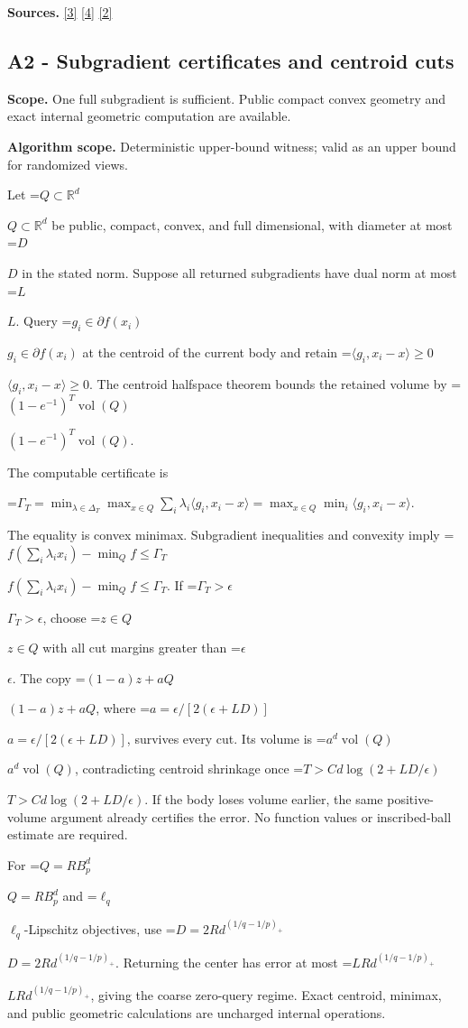\documentclass[10pt,a4paper]{article}
\newcommand{\AtlasMath}[1]{\par\begingroup\centering\setbox0=\hbox{$\displaystyle #1$}\ifdim\wd0>1.4\linewidth\typeout{ATLAS WIDE FORMULA: \the\wd0}\fi\ifdim\wd0>\linewidth\resizebox{\linewidth}{!}{\box0}\else\box0\fi\par\endgroup}
\newcommand{\AtlasInlineMath}[1]{\begingroup\setbox0=\hbox{$#1$}\ifdim\wd0>.4\linewidth\endgroup\AtlasMath{#1}\else\endgroup$#1$\fi}
\begin{document}
\textbf{Sources.} \href{https://arxiv.org/pdf/2101.09740v2}{[3]} \href{https://arxiv.org/pdf/2609.33360v2}{[4]} \href{https://arxiv.org/pdf/2609.10874}{[2]}

\subsection{A2 - Subgradient certificates and centroid cuts}
\textbf{Scope.} One full subgradient is sufficient. Public compact convex geometry and exact internal geometric computation are available.

\textbf{Algorithm scope.} Deterministic upper-bound witness; valid as an upper bound for randomized views.

Let \AtlasInlineMath{Q\subset\mathbb R^d} be public, compact, convex, and full dimensional, with diameter at most \AtlasInlineMath{D} in the stated norm. Suppose all returned subgradients have dual norm at most \AtlasInlineMath{L}. Query \AtlasInlineMath{g_i\in\partial f(x_i)} at the centroid of the current body and retain \AtlasInlineMath{\langle g_i,x_i-x\rangle\ge0}. The centroid halfspace theorem bounds the retained volume by \AtlasInlineMath{(1-e^{-1})^T\operatorname{vol}(Q)}.

The computable certificate is

\AtlasMath{\Gamma_T=\min_{\lambda\in\Delta_T}\max_{x\in Q}\sum_i\lambda_i\langle g_i,x_i-x\rangle
=\max_{x\in Q}\min_i\langle g_i,x_i-x\rangle.}

The equality is convex minimax. Subgradient inequalities and convexity imply
\AtlasInlineMath{f(\sum_i\lambda_ix_i)-\min_Qf\le\Gamma_T}.
If \AtlasInlineMath{\Gamma_T>\epsilon}, choose \AtlasInlineMath{z\in Q} with all cut margins greater than \AtlasInlineMath{\epsilon}. The copy \AtlasInlineMath{(1-a)z+aQ}, where \AtlasInlineMath{a=\epsilon/[2(\epsilon+LD)]}, survives every cut. Its volume is \AtlasInlineMath{a^d\operatorname{vol}(Q)}, contradicting centroid shrinkage once \AtlasInlineMath{T>C d\log(2+LD/\epsilon)}. If the body loses volume earlier, the same positive-volume argument already certifies the error. No function values or inscribed-ball estimate are required.

For \AtlasInlineMath{Q=RB_p^d} and \AtlasInlineMath{\ell_q}-Lipschitz objectives, use \AtlasInlineMath{D=2Rd^{(1/q-1/p)_+}}. Returning the center has error at most \AtlasInlineMath{LRd^{(1/q-1/p)_+}}, giving the coarse zero-query regime. Exact centroid, minimax, and public geometric calculations are uncharged internal operations.
\end{document}
